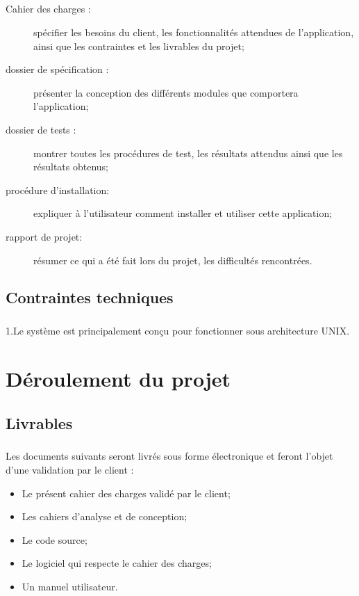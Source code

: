 \paragraph*{}
\begin{description}
\item[Cahier des charges :] spécifier les besoins du client, les fonctionnalités attendues de l’application, ainsi que les contraintes et les livrables du projet;
\item[dossier de spécification :] présenter la conception des différents modules que comportera l’application;
\item[dossier de tests :] montrer toutes les procédures de test, les résultats attendus ainsi que les résultats obtenus;
\item[procédure d'installation:] expliquer à l’utilisateur comment installer et utiliser cette application;
\item[rapport de projet:] résumer ce qui a été fait lors du projet, les difficultés rencontrées.
\end{description}


\section{Contraintes techniques}
\paragraph*{}
1.Le système est principalement conçu pour fonctionner sous architecture UNIX.%




\chapter{Déroulement du projet}


\section {Livrables}
\paragraph*{}
Les documents suivants seront livrés sous forme électronique et feront l'objet d'une validation par le client :
\begin{itemize}
\item Le présent cahier des charges validé par le client;
\item Les cahiers d'analyse et de conception;
\item Le code source;
\item Le logiciel qui respecte le cahier des charges;
\item Un manuel utilisateur.
\end{itemize}


